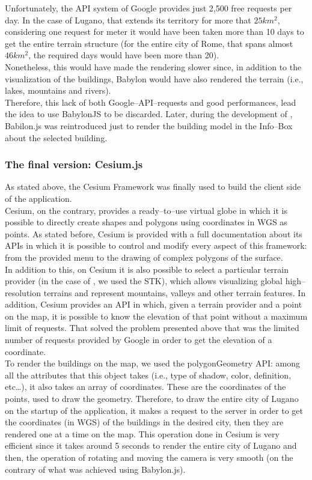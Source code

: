 Unfortunately, the API system of Google provides just 2,500 free requests per day. In the case of Lugano, that extends its territory for more that $25km^2$, considering one request for meter it would have been taken more than 10 days to get the entire terrain structure (for the entire city of Rome, that spans almost $46km^2$, the required days would have been more than 20).\\

Nonetheless, this would have made the rendering slower since, in addition to the visualization of the buildings, Babylon would have also rendered the terrain (i.e., lakes, mountains and rivers).\\
Therefore, this lack of both Google--API--requests and good performances, lead the idea to use BabylonJS to be discarded. Later, during the development of \applicationName, Babilon.js was reintroduced just to render the building model in the Info--Box about the selected building. 
\subsubsection{The final version: Cesium.js}
As stated above, the Cesium Framework was finally used to build the client side of the application.\\
Cesium, on the contrary, provides a ready--to--use virtual globe in which it is possible to directly create shapes and polygons using coordinates in WGS as points. As stated before, Cesium is provided with a full documentation about its APIs in which it is possible to control and modify every aspect of this framework: from the provided menu to the drawing of complex polygons of the surface.\\

In addition to this, on Cesium it is also possible to select a particular terrain provider (in the case of \applicationName, we used the STK), which allows visualizing global high--resolution terrains and represent mountains, valleys and other terrain features. In addition, Cesium provides an API in which, given a terrain provider and a point on the map, it is possible to know the elevation of that point without a maximum limit of requests. That solved the problem presented above that was the limited number of requests provided by Google in order to get the elevation of a coordinate.\\

To render the buildings on the map, we used the polygonGeometry API: among all the attributes that this object takes (i.e., type of shadow, color, definition, etc\dots), it also takes an array of coordinates. These are the coordinates of the points, used to draw the geometry. Therefore, to draw the entire city of Lugano on the startup of the application, it makes a request to the server in order to get the coordinates (in WGS) of the buildings in the desired city, then they are rendered one at a time on the map. This operation done in Cesium is very efficient since it takes around 5 seconds to render the entire city of Lugano and then, the operation of rotating and moving the camera is very smooth (on the contrary of what was achieved using Babylon.js).\\

